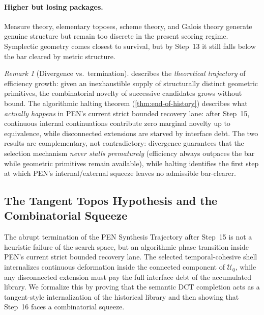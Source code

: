 \documentclass[11pt,a4paper]{article}
\theoremstyle{plain}
\theoremstyle{definition}
\theoremstyle{remark}
\newtheorem{remark}[theorem]{Remark}
\newcommand{\U}{\mathcal{U}}
\begin{document}
\paragraph{Higher but losing packages.}
Measure theory, elementary toposes, scheme theory, and Galois theory generate genuine structure but remain too discrete in the present scoring regime. Symplectic geometry comes closest to survival, but by Step~13 it still falls below the bar cleared by metric structure.

\begin{remark}[Divergence vs.\ termination]
\label{rem:divergence-vs-termination}
 describes the \emph{theoretical trajectory} of efficiency growth: given an inexhaustible supply of structurally distinct geometric primitives, the combinatorial novelty of successive candidates grows without bound.
The algorithmic halting theorem (\cref{thm:end-of-history}) describes what \emph{actually happens} in PEN's current strict bounded recovery lane: after Step~15, continuous internal continuations contribute zero marginal novelty up to equivalence, while disconnected extensions are starved by interface debt.
The two results are complementary, not contradictory: divergence guarantees that the selection mechanism \emph{never stalls prematurely} (efficiency always outpaces the bar while geometric primitives remain available), while halting identifies the first step at which PEN's internal/external squeeze leaves no admissible bar-clearer.
\end{remark}

\subsection{The Tangent Topos Hypothesis and the Combinatorial Squeeze}
\label{sec:tangent-topos}

The abrupt termination of the PEN Synthesis Trajectory after Step~15 is not a heuristic failure of the search space, but an algorithmic phase transition inside PEN's current strict bounded recovery lane. The selected temporal-cohesive shell internalizes continuous deformation inside the connected component of $\U_0$, while any disconnected extension must pay the full interface debt of the accumulated library. We formalize this by proving that the semantic DCT completion acts as a tangent-style internalization of the historical library and then showing that Step~16 faces a combinatorial squeeze.
\end{document}
